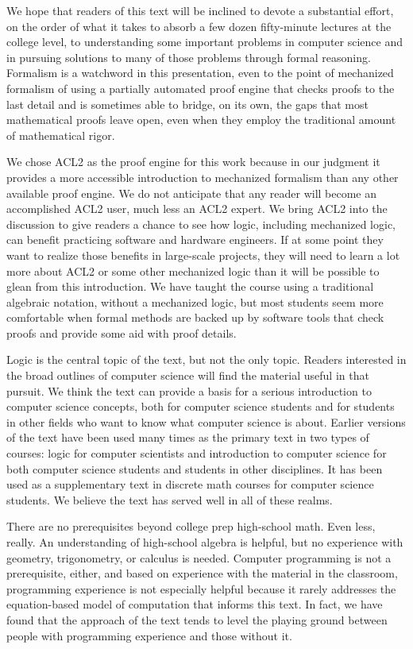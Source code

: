 We hope that readers of this text will be inclined
to devote a substantial effort, on the order
of what it takes to absorb a few dozen fifty-minute
lectures at the college level,
to understanding some important problems in computer science and
in pursuing solutions to many of those problems through formal reasoning.
Formalism is a watchword in this presentation, even to the
point of mechanized formalism of using a partially automated proof engine
that checks proofs to the last detail and is sometimes able
to bridge, on its own, the gaps that most mathematical
proofs leave open, even when they employ the traditional amount
of mathematical rigor.

We chose ACL2 as the proof engine for this work
because in our judgment it provides a more accessible
introduction to mechanized formalism than any other
available proof engine. We do not anticipate that any
reader will become an accomplished ACL2 user,
much less an ACL2 expert. We bring ACL2 into the discussion 
to give readers a chance to see how logic, including mechanized logic, 
can benefit practicing software and hardware engineers.
If at some point they want to realize those benefits in
large-scale projects, they will need to learn a lot more
about ACL2 or some other mechanized logic than it will
be possible to glean from this introduction.
We have taught the course using a traditional algebraic notation,
without a mechanized logic, but most students seem more comfortable
when formal methods are backed up by software tools
that check proofs and provide some aid with proof details.

Logic is the central topic of the text, but not the only topic.
Readers interested in the broad outlines of computer science
will find the material useful in that pursuit. 
We think the text can provide a basis for a serious introduction
to computer science concepts, both for computer science students
and for students in other fields who want to know
what computer science is about.
Earlier versions of the text have been used many times
as the primary text in two types of courses: logic for computer scientists
and introduction to computer science for both computer science students
and students in other disciplines. It has been used as a supplementary
text in discrete math courses for computer science students.
We believe the text has served well in all of these realms.

There are no prerequisites beyond college prep high-school math. 
Even less, really.
An understanding of high-school algebra is helpful, 
but no experience with geometry, trigonometry, or calculus is needed.
Computer programming is not a prerequisite, either, 
and based on experience with the material in the classroom, 
programming experience is not especially helpful 
because it rarely addresses the equation-based model of computation that 
informs this text. In fact, we have found that the approach of the text
tends to level the playing ground between people with programming 
experience and those without it.

